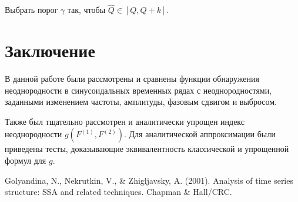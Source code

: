 \documentclass[specialist, substylefile = spbu.rtx,
			   subf, href, 12pt]{disser}
\begin{document}
Выбрать порог $ \gamma $ так, чтобы $ \hat{Q} \in [Q, Q+k] $.




\newpage
\chapter*{Заключение}

В данной работе были рассмотрены и сравнены функции обнаружения неоднородности в синусоидальных временных рядах с неоднородностями, заданными изменением частоты, амплитуды, фазовым сдвигом и выбросом. 

Также был тщательно рассмотрен и аналитически упрощен индекс неоднородности $ g(F^{(1)}, F^{(2)}) $. Для аналитической аппроксимации были приведены тесты, доказывающие эквивалентность классической и упрощенной формул для $ g $.




\begin{thebibliography}{3}
	Golyandina, N., Nekrutkin, V., \& Zhigljavsky, A. (2001). Analysis of time series structure: SSA and related techniques. Chapman \& Hall/CRC.
\end{thebibliography}

	
\end{document}
